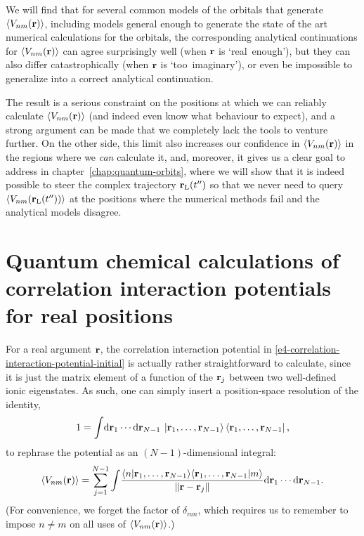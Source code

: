 We will find that for several common models of the orbitals that generate $\left\langle V_{nm}\mathopen{}\left( \vb{r} \right)\mathclose{} \right\rangle$, including models general enough to generate the state of the art numerical calculations for the orbitals, the corresponding analytical continuations for $\left\langle V_{nm}\mathopen{}\left( \vb{r} \right)\mathclose{} \right\rangle$ can agree surprisingly well (when $\vb{r}$ is `real~enough'), but they can also differ catastrophically (when $\vb{r}$ is `too~imaginary'), or even be impossible to generalize into a correct analytical continuation. 

The result is a serious constraint on the positions at which we can reliably calculate $\left\langle V_{nm}\mathopen{}\left( \vb{r} \right)\mathclose{} \right\rangle$ (and indeed even know what behaviour to expect), and a strong argument can be made that we completely lack the tools to venture further. On the other side, this limit also increases our confidence in $\left\langle V_{nm}\mathopen{}\left( \vb{r} \right)\mathclose{} \right\rangle$ in the regions where we \textit{can} calculate it, and, moreover, it gives us a clear goal to address in chapter~\ref{chap:quantum-orbits}, where we will show that it is indeed possible to steer the complex trajectory $\vb{r}_\mathrm{L}(t'')$ so that we never need to query $\left\langle V_{nm}\mathopen{}\left( \vb{r}_\mathrm{L}(t'') \right)\mathclose{} \right\rangle$ at the positions where the numerical methods fail and the analytical models disagree.



\section{Quantum chemical calculations of correlation interaction potentials for real positions}

For a real argument $\vb{r}$, the correlation interaction potential in \eqref{e4-correlation-interaction-potential-initial} is actually rather straightforward to calculate, since it is just the matrix element of a function of the $\vb{r}_j$ between two well-defined ionic eigenstates. As such, one can simply insert a position-space resolution of the identity,
\begin{equation}
1
=
\int\!\mathrm{d}\vb{r}_1\cdots\mathrm{d}\vb{r}_{N-1} \:
\ket{\vb{r}_1,\ldots,\vb{r}_{N-1}}\bra{\vb{r}_1,\ldots,\vb{r}_{N-1}}
,
\end{equation}
to rephrase the potential as an $(N-1)$-dimensional integral:
\begin{equation}
\left\langle V_{nm}\mathopen{}\left( \vb{r} \right)\mathclose{} \right\rangle
=
\sum_{j=1}^{N-1} 
\int\!
\frac{
  \braket{n}{\vb{r}_1,\ldots,\vb{r}_{N-1}} \!
  \braket{\vb{r}_1,\ldots,\vb{r}_{N-1}}{m}
  }{
  \| \vb{r} - \vb{r}_j\|
  }
\mathrm{d}\vb{r}_1\cdots\mathrm{d}\vb{r}_{N-1} 
.
\label{e4-correlation-interaction-potential-integral}
\end{equation}
(For convenience, we forget the factor of $\delta_{mn}$, which requires us to remember to impose $n\neq m$ on all uses of $\left\langle V_{nm}\mathopen{}\left( \vb{r} \right)\mathclose{} \right\rangle$.)

